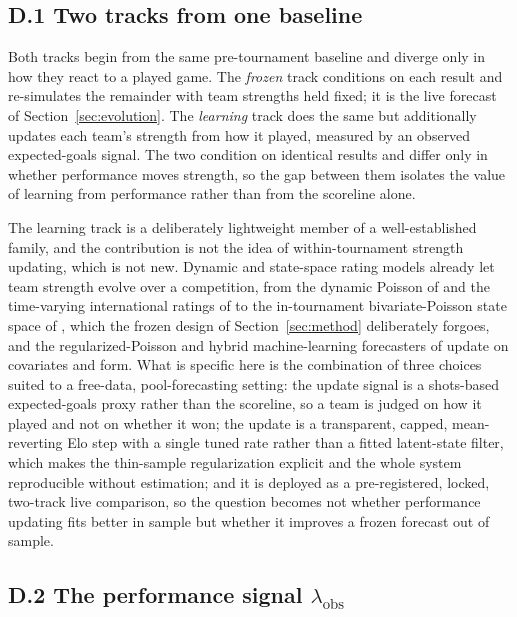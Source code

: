 \documentclass[11pt,letterpaper]{article}
\begin{document}
\subsection*{D.1 \quad Two tracks from one baseline}

Both tracks begin from the same pre-tournament baseline and diverge only in how they react to a played game. The \emph{frozen} track conditions on each result and re-simulates the remainder with team strengths held fixed; it is the live forecast of Section~\ref{sec:evolution}. The \emph{learning} track does the same but additionally updates each team's strength from how it played, measured by an observed expected-goals signal. The two condition on identical results and differ only in whether performance moves strength, so the gap between them isolates the value of learning from performance rather than from the scoreline alone.

The learning track is a deliberately lightweight member of a well-established family, and the contribution is not the idea of within-tournament strength updating, which is not new. Dynamic and state-space rating models already let team strength evolve over a competition, from the dynamic Poisson of \citet{rue2000} and the time-varying international ratings of \citet{bakermchale2015} to the in-tournament bivariate-Poisson state space of \citet{koopmanlit2015}, which the frozen design of Section~\ref{sec:method} deliberately forgoes, and the regularized-Poisson and hybrid machine-learning forecasters of \citet{groll2015, groll2019} update on covariates and form. What is specific here is the combination of three choices suited to a free-data, pool-forecasting setting: the update signal is a shots-based expected-goals proxy rather than the scoreline, so a team is judged on how it played and not on whether it won; the update is a transparent, capped, mean-reverting Elo step with a single tuned rate rather than a fitted latent-state filter, which makes the thin-sample regularization explicit and the whole system reproducible without estimation; and it is deployed as a pre-registered, locked, two-track live comparison, so the question becomes not whether performance updating fits better in sample but whether it improves a frozen forecast out of sample.

\subsection*{D.2 \quad The performance signal $\lambda_{\text{obs}}$}
\end{document}
